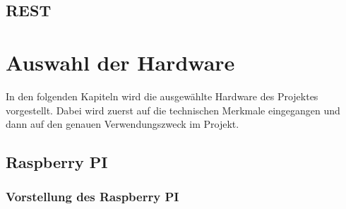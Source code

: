 \documentclass[ngerman]{scrartcl} %
\begin{document}
\subsection{REST}        
\label{sec:REST-1}  

 \cite{Tilkov.2015}
 
 
\newpage
 
\section{Auswahl der Hardware}        
\label{sec:Auswahl der Hardware-1}  

In den folgenden Kapiteln wird die ausgewählte Hardware des Projektes vorgestellt. Dabei wird zuerst auf die technischen Merkmale eingegangen und dann auf den genauen Verwendungszweck im Projekt. 

\subsection{Raspberry PI}        
\label{sec:Raspberry PI-1} 

\subsubsection{Vorstellung des Raspberry PI}        
\label{sec:Vorstellung des Raspberry PI-1} 
\end{document}
